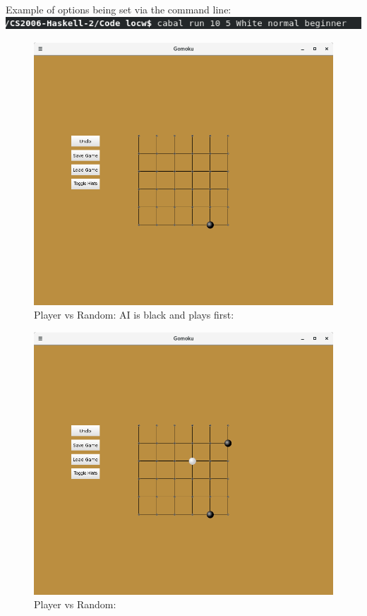 \documentclass[11]{article}
\begin{document}
\begin{flushleft}
	Example of options being set via the command line:
\includegraphics[scale=0.6]{CommandLineArguments.png}
\end{flushleft}

\newpage

\begin{figure}[h]
					\caption{Player vs Random: AI is black and plays first:}				\centering
					\includegraphics[scale=0.5]{Random1.png}
\end{figure}

\begin{figure}[h]
					\caption{Player vs Random:}				\centering
					\includegraphics[scale=0.5]{Random2.png}
\end{figure}
\end{document}
